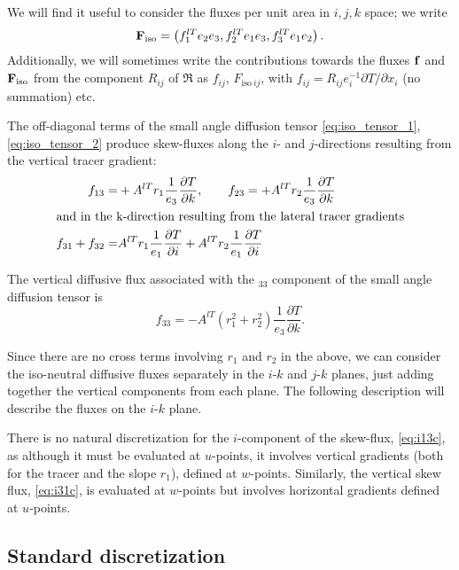 \documentclass[../main/NEMO_manual]{subfiles}
\begin{document}
We will find it useful to consider the fluxes per unit area in $i,j,k$ space; we write
\[
  \mathbf{F}_{\mathrm{iso}}=\left(f_1^{lT}e_2e_3, f_2^{lT}e_1e_3, f_3^{lT}e_1e_2\right).
\]
Additionally, we will sometimes write the contributions towards the fluxes $\mathbf{f}$ and
$\mathbf{F}_{\mathrm{iso}}$ from the component $R_{ij}$ of $\Re$ as $f_{ij}$, $F_{\mathrm{iso}\: ij}$,
with $f_{ij}=R_{ij}e_i^{-1}\partial T/\partial x_i$ (no summation) etc.

The off-diagonal terms of the small angle diffusion tensor
\autoref{eq:iso_tensor_1}, \autoref{eq:iso_tensor_2} produce skew-fluxes along
the $i$- and $j$-directions resulting from the vertical tracer gradient:
\begin{align}
  \label{eq:i13c}
  f_{13}=&+{A^{lT}} r_1\frac{1}{e_3}\frac{\partial T}{\partial k},\qquad f_{23}=+{A^{lT}} r_2\frac{1}{e_3}\frac{\partial T}{\partial k}\\
  \intertext{and in the k-direction resulting from the lateral tracer gradients}
  \label{eq:i31c}
  f_{31}+f_{32}=& {A^{lT}} r_1\frac{1}{e_1}\frac{\partial T}{\partial i}+{A^{lT}} r_2\frac{1}{e_1}\frac{\partial T}{\partial i}
\end{align}

The vertical diffusive flux associated with the $_{33}$ component of the small angle diffusion tensor is
\begin{equation}
  \label{eq:i33c}
  f_{33}=-{A^{lT}}(r_1^2 +r_2^2) \frac{1}{e_3}\frac{\partial T}{\partial k}.
\end{equation}

Since there are no cross terms involving $r_1$ and $r_2$ in the above,
we can consider the iso-neutral diffusive fluxes separately in the $i$-$k$ and $j$-$k$ planes,
just adding together the vertical components from each plane.
The following description will describe the fluxes on the $i$-$k$ plane.

There is no natural discretization for the $i$-component of the skew-flux, \autoref{eq:i13c},
as although it must be evaluated at $u$-points,
it involves vertical gradients (both for the tracer and the slope $r_1$), defined at $w$-points.
Similarly, the vertical skew flux, \autoref{eq:i31c},
is evaluated at $w$-points but involves horizontal gradients defined at $u$-points.

\subsection{Standard discretization}
\end{document}
